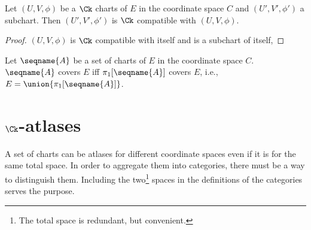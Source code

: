 \documentclass{article}
\begin{document}
\begin{corollary}
Let $(U, V, \phi)$ be a $\Ck$ charts of $E$ in
the coordinate space $C$ and $(U', V', \phi')$ a
subchart. Then $(U', V', \phi')$ is $\Ck$ compatible with
$(U,V,\phi)$.

\begin{proof}
$(U, V, \phi)$ is $\Ck$ compatible with itself and is a subchart of
itself,
\end{proof}
\end{corollary}

\begin{definition}
Let $\seqname{A}$ be a set of charts of $E$ in the coordinate space $C$.
$\seqname{A}$ covers $E$ iff $\pi_1[\seqname{A}]$ covers $E$, i.e.,
$E = \union{{\pi_1[\seqname{A}]}}$.
\end{definition}

\section{$\Ck$-atlases}
\label{sec:ckatlases}
A set of charts can be atlases for different coordinate spaces even if
it is for the same total space.  In order to aggregate them into
categories, there must be a way to distinguish them. Including the
two\footnote{The total space is redundant, but convenient.}
spaces in the definitions of the categories serves the purpose.
\end{document}
